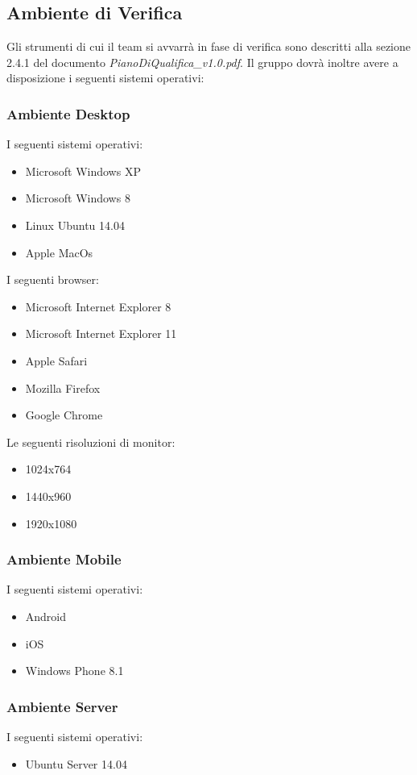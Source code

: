 \subsection{Ambiente di Verifica}
Gli strumenti di cui il team si avvarrà in fase di verifica sono descritti alla sezione 2.4.1 del documento \textit{PianoDiQualifica\_v1.0.pdf}.
Il gruppo dovrà inoltre avere a disposizione i seguenti sistemi operativi:

\subsubsection{Ambiente Desktop}
I seguenti sistemi operativi:
\begin{itemize}
\item Microsoft Windows XP
\item Microsoft Windows 8
\item Linux Ubuntu 14.04
\item Apple MacOs 
\end{itemize}
I seguenti browser:
\begin{itemize}
\item Microsoft Internet Explorer 8
\item Microsoft Internet Explorer 11
\item Apple Safari
\item Mozilla Firefox
\item Google Chrome
\end{itemize}
Le seguenti risoluzioni di monitor:
\begin{itemize}
\item 1024x764
\item 1440x960
\item 1920x1080
\end{itemize}

\subsubsection{Ambiente Mobile}
I seguenti sistemi operativi:
\begin{itemize}
\item Android
\item iOS
\item Windows Phone 8.1
\end{itemize}

\subsubsection{Ambiente Server}
I seguenti sistemi operativi:
\begin{itemize}
\item Ubuntu Server 14.04
\end{itemize}